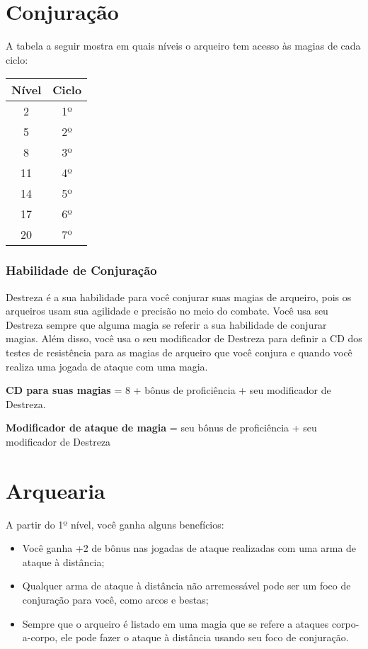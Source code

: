 \documentclass{RPG_Adventure}[2021/10/20]
\begin{document}
\begin{multicols}{2}
\section*{Conjuração}%

A tabela a seguir mostra em quais níveis o arqueiro tem acesso às magias de cada
ciclo:

\begin{center}
\begin{tabular}{|||c||c|||}
    \hline
    \textbf{Nível} & \textbf{Ciclo} \\
    \hline
    2 & 1º \\
    \hline
    5 & 2º \\
    \hline
    8 & 3º \\
    \hline
    11 & 4º \\
    \hline
    14 & 5º \\
    \hline
    17 & 6º \\
    \hline
    20 & 7º \\
    \hline
\end{tabular}
\end{center}

\subsubsection*{Habilidade de Conjuração}%

Destreza é a sua habilidade para você conjurar suas magias de arqueiro, pois os
arqueiros usam sua agilidade e precisão no meio do combate.  Você usa seu
Destreza sempre que alguma magia se referir a sua habilidade de conjurar magias.
Além disso, você usa o seu modificador de Destreza para definir a CD dos testes
de resistência para as magias de arqueiro que você conjura e quando você realiza
uma jogada de ataque com uma magia.

\begin{center}
\textbf{CD para suas magias} = 8 + bônus de proficiência + seu modificador de
Destreza. \nl

\textbf{Modificador de ataque de magia} = seu bônus de proficiência + seu
modificador de Destreza
\end{center}

\section*{Arquearia}%

A partir do 1º nível, você ganha alguns benefícios:
\begin{itemize}
    \item Você ganha +2 de bônus nas jogadas de ataque realizadas com uma arma de ataque à distância;
    \item Qualquer arma de ataque à distância não arremessável pode ser um foco
        de conjuração para você, como arcos e bestas;
    \item Sempre que o arqueiro é listado em uma magia que se refere a ataques
        corpo-a-corpo, ele pode fazer o ataque à distância usando seu foco de
        conjuração.
\end{itemize}


\end{multicols}
\end{document}
